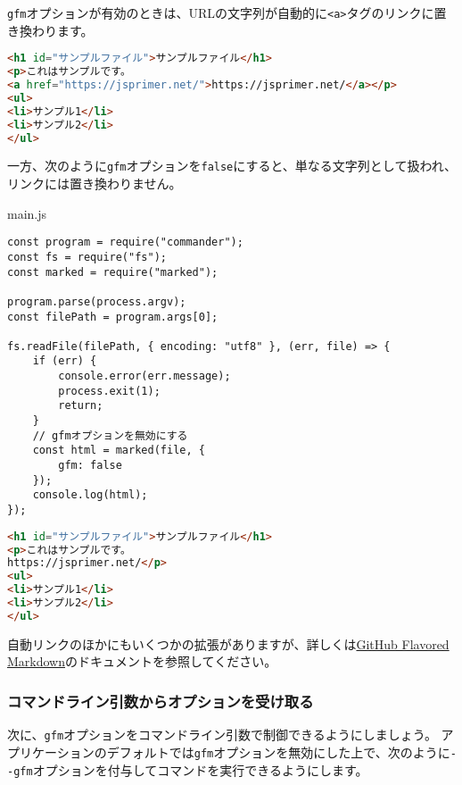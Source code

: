 \texttt{gfm}オプションが有効のときは、URLの文字列が自動的に\texttt{<a>}タグのリンクに置き換わります。

\begin{lstlisting}[language=HTML]
<h1 id="サンプルファイル">サンプルファイル</h1>
<p>これはサンプルです。
<a href="https://jsprimer.net/">https://jsprimer.net/</a></p>
<ul>
<li>サンプル1</li>
<li>サンプル2</li>
</ul>
\end{lstlisting}

一方、次のように\texttt{gfm}オプションを\texttt{false}にすると、単なる文字列として扱われ、リンクには置き換わりません。

\begin{listtitle}
main.js
\end{listtitle}
\begin{lstlisting}
const program = require("commander");
const fs = require("fs");
const marked = require("marked");

program.parse(process.argv);
const filePath = program.args[0];

fs.readFile(filePath, { encoding: "utf8" }, (err, file) => {
    if (err) {
        console.error(err.message);
        process.exit(1);
        return;
    }
    // gfmオプションを無効にする
    const html = marked(file, {
        gfm: false
    });
    console.log(html);
});
\end{lstlisting}
\listend

\begin{lstlisting}[language=HTML]
<h1 id="サンプルファイル">サンプルファイル</h1>
<p>これはサンプルです。
https://jsprimer.net/</p>
<ul>
<li>サンプル1</li>
<li>サンプル2</li>
</ul>
\end{lstlisting}

自動リンクのほかにもいくつかの拡張がありますが、詳しくは\href{https://github.github.com/gfm/}{GitHub
Flavored Markdown}のドキュメントを参照してください。

\hypertarget{receive-option}{%
\subsubsection{コマンドライン引数からオプションを受け取る}\label{receive-option}}

次に、\texttt{gfm}オプションをコマンドライン引数で制御できるようにしましょう。
アプリケーションのデフォルトでは\texttt{gfm}オプションを無効にした上で、次のように\texttt{-\/-gfm}オプションを付与してコマンドを実行できるようにします。

